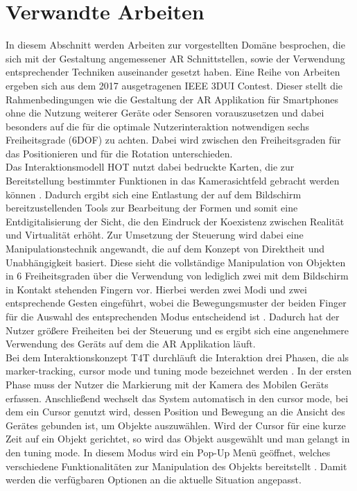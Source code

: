 \documentclass[12pt,a4paper, oneside]{scrartcl}
\begin{document}
\section{Verwandte Arbeiten}
In diesem Abschnitt werden Arbeiten zur vorgestellten Domäne besprochen, die sich mit der Gestaltung angemessener AR Schnittstellen, sowie der Verwendung entsprechender Techniken auseinander gesetzt haben.
Eine Reihe von Arbeiten ergeben sich aus dem 2017 ausgetragenen IEEE 3DUI Contest. Dieser stellt die Rahmenbedingungen wie die Gestaltung der AR Applikation für Smartphones ohne die Nutzung weiterer Geräte oder Sensoren vorauszusetzen und dabei besonders auf die für die optimale Nutzerinteraktion notwendigen sechs Freiheitsgrade  (6DOF) zu achten. Dabei wird zwischen den Freiheitsgraden für das Positionieren und für die Rotation unterschieden. \\
Das Interaktionsmodell HOT nutzt dabei bedruckte Karten, die zur Bereitstellung bestimmter Funktionen in das Kamerasichtfeld gebracht werden können 
\cite{attanasio_2017}. 
Dadurch ergibt sich eine Entlastung der auf dem Bildschirm bereitzustellenden Tools zur Bearbeitung der Formen und somit eine Entdigitalisierung der Sicht, die den Eindruck der Koexistenz zwischen Realität und Virtualität erhöht. Zur Umsetzung der Steuerung wird dabei eine Manipulationstechnik angewandt, die auf dem Konzept von Direktheit und Unabhängigkeit basiert. Diese sieht die vollständige Manipulation von Objekten in 6 Freiheitsgraden über die Verwendung von lediglich zwei mit dem Bildschirm in Kontakt stehenden Fingern vor. Hierbei werden zwei Modi und zwei entsprechende Gesten eingeführt, wobei die Bewegungsmuster der beiden Finger für die Auswahl des entsprechenden Modus entscheidend ist \cite{liu_2012}. Dadurch hat der Nutzer größere Freiheiten bei der Steuerung und es ergibt sich eine angenehmere Verwendung des Geräts auf dem die AR Applikation läuft. \\
Bei dem Interaktionskonzept T4T durchläuft die Interaktion drei Phasen, die als marker-tracking, cursor mode und tuning mode bezeichnet werden 
\cite{cannavo_2020}.
In der ersten Phase muss der Nutzer die Markierung mit der Kamera des Mobilen Geräts erfassen. Anschließend wechselt das System automatisch in den cursor mode, bei dem ein Cursor genutzt wird, dessen Position und Bewegung an die Ansicht des Gerätes gebunden ist, um Objekte auszuwählen. Wird der Cursor für eine kurze Zeit auf ein Objekt gerichtet, so wird das Objekt ausgewählt und man gelangt in den tuning mode. In diesem Modus wird ein Pop-Up Menü geöffnet, welches verschiedene Funktionalitäten zur Manipulation des Objekts bereitstellt \cite{cannavo_2017}. Damit werden die verfügbaren Optionen an die aktuelle Situation angepasst.
\end{document}
